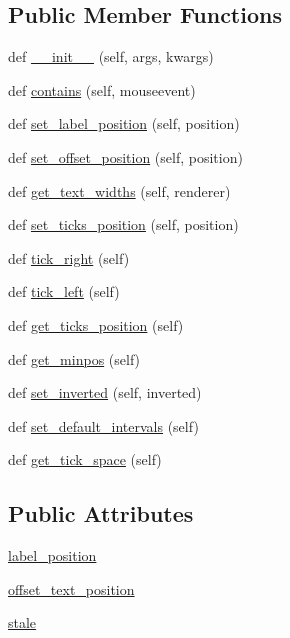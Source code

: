 \subsection*{Public Member Functions}
\begin{DoxyCompactItemize}
\item 
def \hyperlink{classmatplotlib_1_1axis_1_1YAxis_a32a7d30f2dc7d7ea0dbe7cdf883e7915}{\+\_\+\+\_\+init\+\_\+\+\_\+} (self, args, kwargs)
\item 
def \hyperlink{classmatplotlib_1_1axis_1_1YAxis_a9bfc9e7cddc99fc42642deeeb52a2abf}{contains} (self, mouseevent)
\item 
def \hyperlink{classmatplotlib_1_1axis_1_1YAxis_ae6e2eb3cb215cc419efbbf2ac4ffc558}{set\+\_\+label\+\_\+position} (self, position)
\item 
def \hyperlink{classmatplotlib_1_1axis_1_1YAxis_a20e54381c2c0f285f1d29af440aace0f}{set\+\_\+offset\+\_\+position} (self, position)
\item 
def \hyperlink{classmatplotlib_1_1axis_1_1YAxis_a836ef8c82ee6ec9744214d95a44127c9}{get\+\_\+text\+\_\+widths} (self, renderer)
\item 
def \hyperlink{classmatplotlib_1_1axis_1_1YAxis_a3c8f0de1bf4742c8a44a4a2fb2e2081e}{set\+\_\+ticks\+\_\+position} (self, position)
\item 
def \hyperlink{classmatplotlib_1_1axis_1_1YAxis_a080a80e97b2cbfc1db5bfa37f97220ce}{tick\+\_\+right} (self)
\item 
def \hyperlink{classmatplotlib_1_1axis_1_1YAxis_a7dcb89bfd35e4a52a2d42b626f2e9a87}{tick\+\_\+left} (self)
\item 
def \hyperlink{classmatplotlib_1_1axis_1_1YAxis_a37780c9f5446a148da04ebb7180ff044}{get\+\_\+ticks\+\_\+position} (self)
\item 
def \hyperlink{classmatplotlib_1_1axis_1_1YAxis_aedc2d677c9c748b0806c27008aa79d40}{get\+\_\+minpos} (self)
\item 
def \hyperlink{classmatplotlib_1_1axis_1_1YAxis_ac4e06176292c9f23a512f92c436c9457}{set\+\_\+inverted} (self, inverted)
\item 
def \hyperlink{classmatplotlib_1_1axis_1_1YAxis_adf8256a28d9fb854242639a41af6c950}{set\+\_\+default\+\_\+intervals} (self)
\item 
def \hyperlink{classmatplotlib_1_1axis_1_1YAxis_afc28a21f7ef1cfa05cbc53616e452fd6}{get\+\_\+tick\+\_\+space} (self)
\end{DoxyCompactItemize}
\subsection*{Public Attributes}
\begin{DoxyCompactItemize}
\item 
\hyperlink{classmatplotlib_1_1axis_1_1YAxis_a9a3b1e65beb2a667fb2e889e545866c9}{label\+\_\+position}
\item 
\hyperlink{classmatplotlib_1_1axis_1_1YAxis_a463d5db7bd952fb6394ccc7c56001f2e}{offset\+\_\+text\+\_\+position}
\item 
\hyperlink{classmatplotlib_1_1axis_1_1YAxis_aca4411da8d505e6fcd29af3b0ceec29e}{stale}
\end{DoxyCompactItemize}
